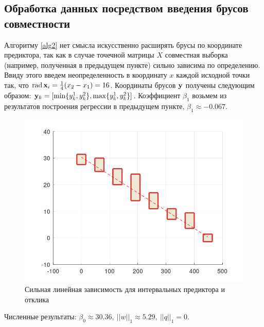 \documentclass[a4paper]{article}
\begin{document}
\subsection{Обработка данных посредством введения брусов совместности}
Алгоритму \ref{alg2} нет смысла искусственно расширять брусы по координате предиктора, так как в случае точечной матрицы $X$ совместная выборка (например, полученная в предыдущем пункте) сильно зависима по определению. Ввиду этого введем неопределенность в координату $x$ каждой исходной точки так, что $\operatorname{rad}\mathbf{x}_i=\frac{1}{4}(x_2-x_1)=16$. Координаты брусов $\mathbf{y}$ получены следующим образом: $\mathbf{y}_k=[\min\{y_k^1,y_k^2\}, \max\{y_k^1,y_k^2\}]$. Коэффициент $\beta_1$ возьмем из результатов построения регрессии в предыдущем пункте, $\beta_1\approx-0.067$.
\begin{figure}[H]
    \centering
    \includegraphics[width=15cm]{img/res_2.png}
    \caption{Сильная линейная зависимость для интервальных предиктора и отклика}
    \label{fig:res_2}
\end{figure}
Численные результаты: $\beta_0\approx30.36,\:||w||_1\approx5.29,\:||q||_1=0$.
\end{document}
